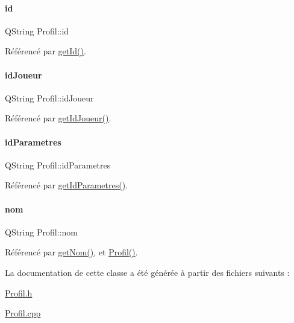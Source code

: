 \paragraph{\texorpdfstring{id}{id}}
{\footnotesize\ttfamily Q\+String Profil\+::id\hspace{0.3cm}{\ttfamily [read]}}



Référencé par \hyperlink{class_profil_aa51afb45d2062ef33145b21952e7d32a}{get\+Id()}.

\mbox{\label{class_profil_a0d8277364c321a3797f91e3c32dbe47f}} 
\paragraph{\texorpdfstring{id\+Joueur}{idJoueur}}
{\footnotesize\ttfamily Q\+String Profil\+::id\+Joueur\hspace{0.3cm}{\ttfamily [read]}}



Référencé par \hyperlink{class_profil_aa54d7307013204c361643f019bb924a9}{get\+Id\+Joueur()}.

\mbox{\label{class_profil_a2cdcb0b7614e783ba20ae93eaefebd0c}} 
\paragraph{\texorpdfstring{id\+Parametres}{idParametres}}
{\footnotesize\ttfamily Q\+String Profil\+::id\+Parametres\hspace{0.3cm}{\ttfamily [read]}}



Référencé par \hyperlink{class_profil_a806de0fed3f11021eb5294b93efd721d}{get\+Id\+Parametres()}.

\mbox{\label{class_profil_a919585bdd5c7e7382e6a25c5152d0ca3}} 
\paragraph{\texorpdfstring{nom}{nom}}
{\footnotesize\ttfamily Q\+String Profil\+::nom\hspace{0.3cm}{\ttfamily [read]}}



Référencé par \hyperlink{class_profil_a14d2e1976d9e4f5eecfea9347a7647b0}{get\+Nom()}, et \hyperlink{class_profil_a4a208a6e5cf119025899b4ec1f3a8e08}{Profil()}.



La documentation de cette classe a été générée à partir des fichiers suivants \+:\begin{DoxyCompactItemize}
\item 
\hyperlink{_profil_8h}{Profil.\+h}\item 
\hyperlink{_profil_8cpp}{Profil.\+cpp}\end{DoxyCompactItemize}
